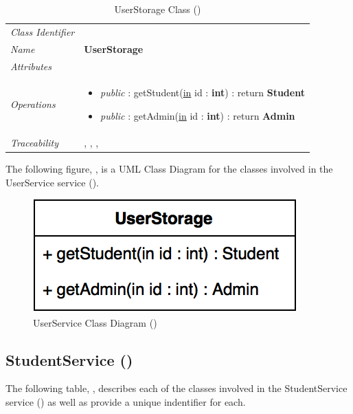 \documentclass[12pt,letterpaper]{article}
\begin{document}
\begin{table}[H]
    \caption{UserStorage Class ()} 
	\begin{tabu} to 
		\toprule
		Class Identifier &  \\
		Name & {\bf UserStorage} \\
		Attributes & \\

		Operations &
		\begin{minipage}[t]{\linewidth}
			\begin{itemize}
			    \item {\it public} : getStudent(\underline{in} id : {\bf int}) : return {\bf Student}
			    \item {\it public} : getAdmin(\underline{in} id : {\bf int}) : return {\bf Admin}
	        \end{itemize}
	    \end{minipage} \\
	    	Traceability & , , , \\
		\toprule
	\end{tabu}
\end{table}

\newpage{}
The following figure, , is a UML Class Diagram for the classes involved in the UserService service ().

\begin{figure}[H]
	\centering{}
	\includegraphics[scale=0.45]{imgs/d3/interfaces/user.png}
	\caption{UserService Class Diagram ()}
\end{figure}

\subsection{StudentService ()}

The following table, , describes each of the classes involved in the StudentService service () as well as provide a unique indentifier for each.
\end{document}

